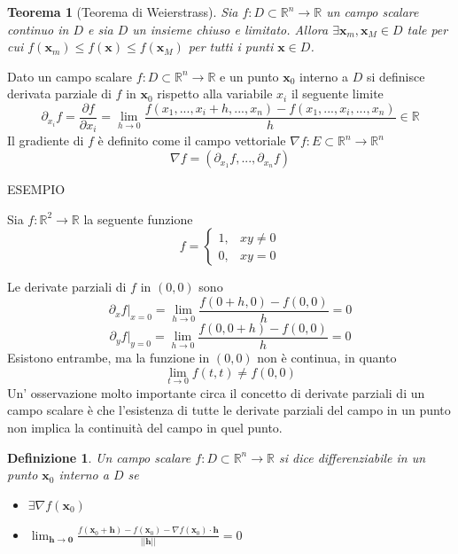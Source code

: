 \documentclass{article}
\newtheorem{theorem}{Teorema}
\newtheorem{definition}{Definizione}
\begin{document}
            \begin{theorem} [Teorema di Weierstrass]
                Sia $f: D \subset \mathbb{R}^{n} \rightarrow \mathbb{R}$ un campo scalare continuo in $D$ e sia $D$ un insieme chiuso e limitato. Allora $\exists \mathbf{x}_m, \mathbf{x}_M \in D$ tale per cui $f(\mathbf{x}_m) \leq f(\mathbf{x}) \leq f(\mathbf{x}_M)$ per tutti i punti $\mathbf{x} \in D$.
            \end{theorem}

            \vspace{10pt}
            Dato un campo scalare $f: D \subset \mathbb{R}^{n} \rightarrow \mathbb{R}$ e un punto $\mathbf{x}_0$ interno a $D$ si definisce derivata parziale di $f$ in $\mathbf{x}_0$ rispetto alla variabile $x_i$ il seguente limite
            \[
                \partial_{x_i} f = \frac{\partial f}{\partial x_i} = \lim_{h \rightarrow 0} \frac{f(x_1, ..., x_i + h, ..., x_n) - f(x_1, ..., x_i, ..., x_n)}{h} \in \mathbb{R}
            \]
            Il gradiente di $f$ è definito come il campo vettoriale $\nabla f: E \subset \mathbb{R}^{n} \rightarrow \mathbb{R}^{n}$
            \[
                \nabla f = (\partial_{x_1} f, ..., \partial_{x_n} f)
            \]

            ESEMPIO

            Sia $f: \mathbb{R}^2 \rightarrow \mathbb{R}$ la seguente funzione
            \[
                f = \begin{cases} 1, & xy \neq 0 \\ 0, & xy = 0 \end{cases}
            \]

            Le derivate parziali di $f$ in $(0, 0)$ sono
            \[
                \partial_{x} f |_{x = 0} = \lim_{h \rightarrow 0} \frac{f(0 + h, 0) - f(0, 0)}{h} = 0
            \]
            \[
                \partial_{y} f |_{y = 0} = \lim_{h \rightarrow 0} \frac{f(0, 0 + h) - f(0, 0)}{h} = 0
            \]
            Esistono entrambe, ma la funzione in $(0, 0)$ non è continua, in quanto
            \[
                \lim_{t \rightarrow 0} f(t, t) \neq f(0, 0)
            \]
            Un' osservazione molto importante circa il concetto di derivate parziali di un campo scalare è che 
            l'esistenza di tutte le derivate parziali del campo in un punto non implica la continuità del campo in quel punto.

            \vspace{10pt}
            \begin{definition}
                Un campo scalare $f: D \subset \mathbb{R}^{n} \rightarrow \mathbb{R}$ si dice differenziabile in un punto $\mathbf{x}_0$ interno a $D$ se
                \begin{itemize}
                    \item $\exists \nabla f (\mathbf{x}_0)$
                    \item $\displaystyle \lim_{\mathbf{h} \rightarrow \mathbf{0}} \frac{f(\mathbf{x}_0 + \mathbf{h}) - f(\mathbf{x}_0) - \nabla f(\mathbf{x}_0) \cdot \mathbf{h}}{|| \mathbf{h} ||} = 0$
                \end{itemize}
            \end{definition}
\end{document}
